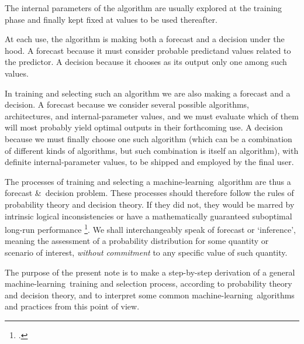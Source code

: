 \documentclass[\ifafour a4paper,12pt,\else a5paper,10pt,\fi%
onecolumn,oneside,article,%
british%
]{memoir}
\theoremstyle{remark}
\theoremstyle{innote}
\newcommand*{\citep}{\footcites}
\newcommand*{\amp}{\&}
\renewcommand*{\|}[1][]{\nonscript\:#1\vert\nonscript\:\mathopen{}}
\newcommand*{\chaps}{chs}%
\newcommand*{\eg}{{e.g.}}
\newcommand*{\ml}{machine-learning}
\begin{document}
The internal parameters of the algorithm are usually explored at the
training phase and finally kept fixed at values to be used thereafter.

At each use, the algorithm is making both a forecast and a decision under
the hood. A forecast because it must consider probable predictand values
related to the predictor. A decision because it chooses as its output only
one among such values.


In training and selecting such an algorithm we are also making a forecast
and a decision. A forecast because we consider several possible algorithms,
architectures, and internal-parameter values, and we must evaluate which of
them will most probably yield optimal outputs in their forthcoming use. A
decision because we must finally choose one such algorithm (which can be a
combination of different kinds of algorithms, but such combination is
itself an algorithm), with definite internal-parameter values, to be
shipped and employed by the final user.

The processes of training and selecting a \ml\ algorithm are thus a
forecast \amp\ decision problem. These processes should therefore follow
the rules of probability theory and decision theory. If they did not, they
would be marred by intrinsic logical inconsistencies or have a
mathematically guaranteed suboptimal long-run performance
\citep{prattetal1995_r1996,berger1980_r1985,raiffaetal1961_r2000,bernardoetal1994_r2000}[esp.\
\chaps~13--14]{jaynes1994_r2003}{degroot1970_r2004}[for early works
see][]{wald1950_r1964,savage1954_r1972,neumannetal1944_r1955,bernoulli1738}[for
introductions and summaries:][]{good1952,prattetal1964,north1968}[and the
brilliant][]{raiffa1968_r1970}[it is known that human beings often do not
follow rational decision theory (nor logic for that matter); this is why
logic, probability theory, decision theory are \emph{normative}, not
descriptive, theories; see \eg][]{tversky1975,tverskyetal1981}. We shall
interchangeably speak of forecast or \enquote*{inference}, meaning the
assessment of a probability distribution for some quantity or scenario of
interest, \emph{without commitment} to any specific value of such quantity.


The purpose of the present note is to make a step-by-step derivation of a
general \ml\ training and selection process, according to probability
theory and decision theory, and to interpret some common \ml\ algorithms
and practices from this point of view.

\end{document}
